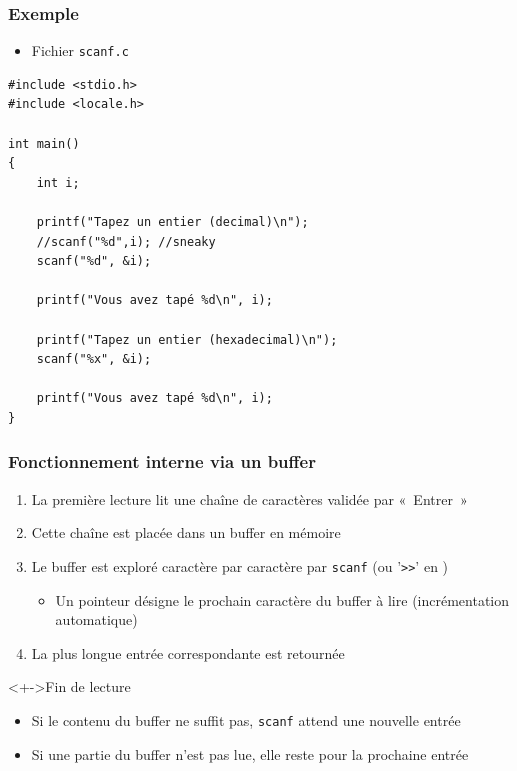 \begin{frame}[containsverbatim]
\frametitle{Exemple}
\begin{itemize}
\item Fichier \texttt{scanf.c}
\end{itemize}
\begin{lstlisting}
#include <stdio.h>
#include <locale.h>

int main()
{	
	int i;

	printf("Tapez un entier (decimal)\n");
	//scanf("%d",i); //sneaky
	scanf("%d", &i);
	
	printf("Vous avez tapé %d\n", i);
	
	printf("Tapez un entier (hexadecimal)\n");
	scanf("%x", &i);
		
	printf("Vous avez tapé %d\n", i);
}
\end{lstlisting}
\end{frame}

\begin{frame}
\frametitle{Fonctionnement interne via un buffer}
\begin{enumerate}[<+->]
\item La première lecture lit une chaîne de caractères validée par «~Entrer~»
\item Cette chaîne est placée dans un buffer en mémoire
\item Le buffer est exploré caractère par caractère par \texttt{scanf} (ou '\texttt{>>}' en \cpp)
	\begin{itemize}
	\item Un pointeur désigne le prochain caractère du buffer à lire (incrémentation automatique)
	\end{itemize}
\item La plus longue entrée correspondante est retournée
\end{enumerate}
\begin{alertblock}<+->{Fin de lecture}
	\begin{itemize}[<+->]
	\item Si le contenu du buffer ne suffit pas, \texttt{scanf} attend une nouvelle entrée
	\item Si une partie du buffer n'est pas lue, elle reste pour la prochaine entrée
	\end{itemize}
\end{alertblock}
\end{frame}

